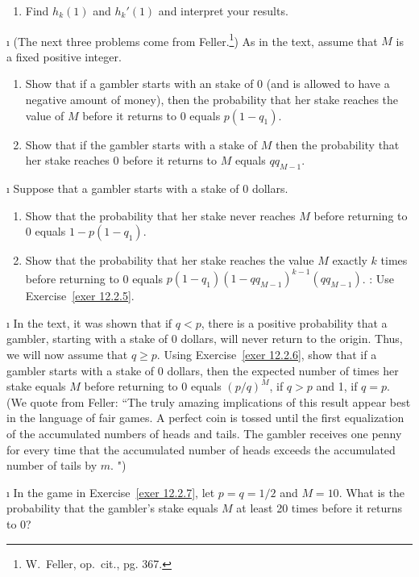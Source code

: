 \begin{LJSItem}
\begin{enumerate}
\item Find $h_k(1)$ and $h_k'(1)$ and interpret your results.
\end{enumerate} 

\i\label{exer 12.2.5} (The next three problems come from Feller.\footnote{W.~Feller, op.\ cit.,
pg. 367.}) 
As in the text, assume that $M$ is a fixed positive integer. 

\begin{enumerate}
\item Show that if a gambler starts with an stake of 0 (and is allowed to have a negative
amount of money), then the probability that her stake reaches the value of $M$ before it returns
to 0 equals $p(1 - q_1)$.
\item Show that if the gambler starts with a stake of $M$ then the probability that her stake
reaches 0 before it returns to $M$ equals $qq_{M-1}$.
\end{enumerate}

\i\label{exer 12.2.6} Suppose that a gambler starts with a stake of 0 dollars.
\begin{enumerate} 
\item  Show that the probability that her stake never reaches $M$ before returning to 0 equals
$1 - p(1 - q_1)$.

\item  Show that the probability that her stake reaches the value $M$ exactly $k$ times before
returning to 0 equals $p(1-q_1)(1 - qq_{M-1})^{k-1}(qq_{M-1})$.  :  
Use Exercise~\ref{exer 12.2.5}.
\end{enumerate} 

\i\label{exer 12.2.7} In the text, it was shown that if $q < p$, there is a positive probability
that a gambler, starting with a stake of 0 dollars, will never return to the origin.  Thus, we
will now assume that $q \ge p$.  Using Exercise~\ref{exer 12.2.6}, show that if a gambler starts with a
stake of 0 dollars, then the expected number of times her stake equals $M$ before returning to
0 equals $(p/q)^M$, if $q > p$ and 1, if $q = p$.  (We quote from Feller:  ``The truly amazing
implications of this result appear best in the language of fair games.  A perfect coin is tossed
until the first equalization of the accumulated numbers of heads and tails.  The gambler receives
one penny for every time that the accumulated number of heads exceeds the accumulated number of
tails by $m$. ")

\i\label{exer 12.2.8} In the game in Exercise~\ref{exer 12.2.7}, let $p = q = 1/2$ and $M = 10$.  What
is the probability that the gambler's stake equals $M$ at least 20 times before it returns to 0?


\end{LJSItem}
